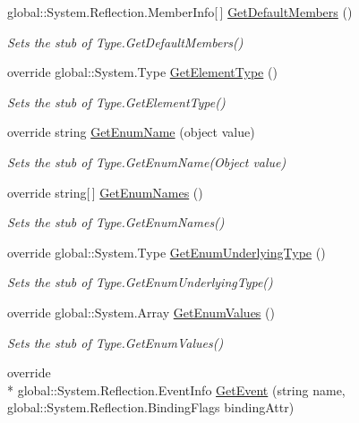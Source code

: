 \begin{DoxyCompactItemize}
global\-::\-System.\-Reflection.\-Member\-Info\mbox{[}$\,$\mbox{]} \hyperlink{class_system_1_1_fakes_1_1_stub_type_a3bbba5194991c4b687bbd150f026ffc5}{Get\-Default\-Members} ()
\begin{DoxyCompactList}\small\item\em Sets the stub of Type.\-Get\-Default\-Members()\end{DoxyCompactList}\item 
override global\-::\-System.\-Type \hyperlink{class_system_1_1_fakes_1_1_stub_type_acde7402822bedb8926e57044920acc14}{Get\-Element\-Type} ()
\begin{DoxyCompactList}\small\item\em Sets the stub of Type.\-Get\-Element\-Type()\end{DoxyCompactList}\item 
override string \hyperlink{class_system_1_1_fakes_1_1_stub_type_a047f2be0863a3eea1dcf89602e17b355}{Get\-Enum\-Name} (object value)
\begin{DoxyCompactList}\small\item\em Sets the stub of Type.\-Get\-Enum\-Name(\-Object value)\end{DoxyCompactList}\item 
override string\mbox{[}$\,$\mbox{]} \hyperlink{class_system_1_1_fakes_1_1_stub_type_aa2caf4f8a95c095a9f14ee9fc0b3047c}{Get\-Enum\-Names} ()
\begin{DoxyCompactList}\small\item\em Sets the stub of Type.\-Get\-Enum\-Names()\end{DoxyCompactList}\item 
override global\-::\-System.\-Type \hyperlink{class_system_1_1_fakes_1_1_stub_type_af3842a10dc67d34a1ad14a866a053cb3}{Get\-Enum\-Underlying\-Type} ()
\begin{DoxyCompactList}\small\item\em Sets the stub of Type.\-Get\-Enum\-Underlying\-Type()\end{DoxyCompactList}\item 
override global\-::\-System.\-Array \hyperlink{class_system_1_1_fakes_1_1_stub_type_adbfce263a0c5f863955d903119cca335}{Get\-Enum\-Values} ()
\begin{DoxyCompactList}\small\item\em Sets the stub of Type.\-Get\-Enum\-Values()\end{DoxyCompactList}\item 
override \\*
global\-::\-System.\-Reflection.\-Event\-Info \hyperlink{class_system_1_1_fakes_1_1_stub_type_a15650ca4c90dc64df0794b88339ffe9e}{Get\-Event} (string name, global\-::\-System.\-Reflection.\-Binding\-Flags binding\-Attr)

\end{DoxyCompactItemize}
